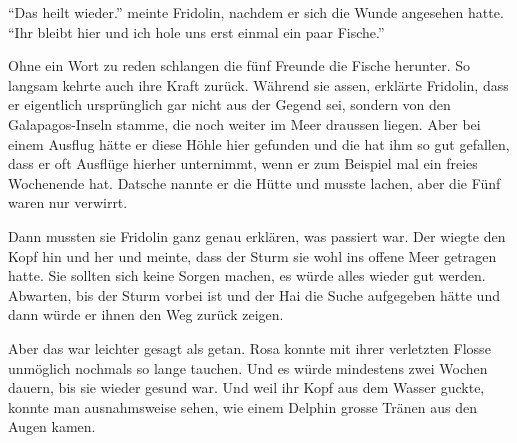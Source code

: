 \enquote{Das heilt wieder.} meinte Fridolin, nachdem er sich die Wunde angesehen hatte. \enquote{Ihr bleibt hier und ich hole uns erst einmal ein paar Fische.}

Ohne ein Wort zu reden schlangen die fünf Freunde die Fische herunter. So langsam kehrte auch ihre Kraft zurück. Während sie assen, erklärte Fridolin, dass er eigentlich ursprünglich gar nicht aus der Gegend sei, sondern von den Galapagos-Inseln stamme, die noch weiter im Meer draussen liegen. Aber bei einem Ausflug hätte er diese Höhle hier gefunden und die hat ihm so gut gefallen, dass er oft Ausflüge hierher unternimmt, wenn er zum Beispiel mal ein freies Wochenende hat. Datsche nannte er die Hütte und musste lachen, aber die Fünf waren nur verwirrt. 

Dann mussten sie Fridolin ganz genau erklären, was passiert war. Der wiegte den Kopf hin und her und meinte, dass der Sturm sie wohl ins offene Meer getragen hatte. Sie sollten sich keine Sorgen machen, es würde alles wieder gut werden. Abwarten, bis der Sturm vorbei ist und der Hai die Suche aufgegeben hätte und dann würde er ihnen den Weg zurück zeigen.

Aber das war leichter gesagt als getan. Rosa konnte mit ihrer verletzten Flosse unmöglich nochmals so lange tauchen. Und es würde mindestens zwei Wochen dauern, bis sie wieder gesund war. Und weil ihr Kopf aus dem Wasser guckte, konnte man ausnahmsweise sehen, wie einem Delphin grosse Tränen aus den Augen kamen.

